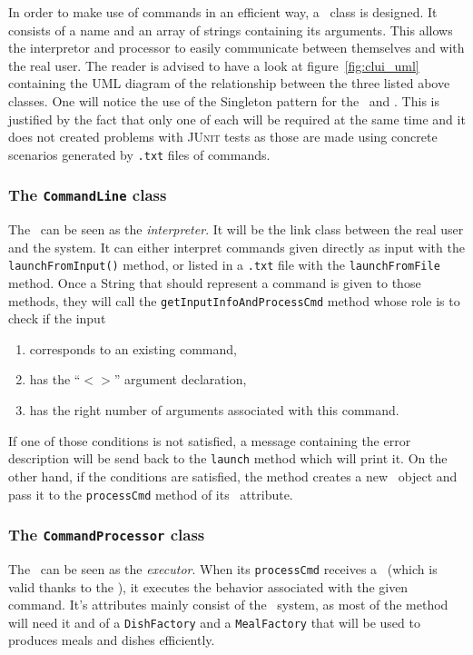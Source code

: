 In order to make use of commands in an efficient way,
a \Command~class is designed.
It consists of a name and an array
of strings containing its arguments.
This allows the interpretor and processor to easily
communicate between themselves and with the real user.
The reader is advised to have a look at figure~\ref{fig:clui_uml}
containing the UML diagram of the relationship between
the three listed above classes.
One will notice the use of the Singleton pattern for
the \CommandProcessor~and \CommandLine.
This is justified by the fact that only one
of each will be required at the same time
and it does not created problems with \textsc{JUnit} tests
as those are made using concrete scenarios
generated by \texttt{.txt} files of commands.

\subsubsection{The \texttt{CommandLine} class} %
\label{ssub:the_commandline_class}
The \CommandLine~can be seen as the \emph{interpreter}. It will be the link
class between the real user and the system. It can either interpret commands
given directly as input with the \lstinline|launchFromInput()| method,
or listed in a \texttt{.txt} file with the \lstinline|launchFromFile| method.
Once a String that should represent a command is given to those methods,
they will call the \lstinline|getInputInfoAndProcessCmd| method whose
role is to check if the input
\begin{enumerate}
  \item corresponds to an existing command,
  \item has the ``$<>$'' argument declaration,
  \item has the right number of arguments associated with this command. 
\end{enumerate}
If one of those conditions is not satisfied, a message containing the
error description will be send back to the \lstinline|launch| method
which will print it.
On the other hand, if the conditions are satisfied, the method
creates a new \Command~object and pass it to the \lstinline|processCmd|
method of its \CommandProcessor~attribute.

\subsubsection{The \texttt{CommandProcessor} class} %
\label{ssub:the_commandprocessor_class}
The \CommandProcessor~can be seen as the \emph{executor}.
When its \lstinline|processCmd| receives a \Command~(which
is valid thanks to the \CommandLine),
it executes the behavior associated with the given command.
It's attributes mainly consist of the \Core~system,
as most of the method will need it and of 
a \lstinline|DishFactory| and a \lstinline|MealFactory|
that will be used to produces meals and dishes efficiently.

